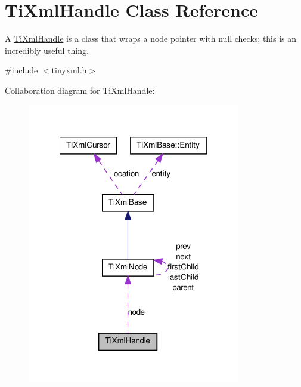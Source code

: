 \hypertarget{classTiXmlHandle}{
\section{TiXmlHandle Class Reference}
\label{dd/d98/classTiXmlHandle}
}


A \hyperlink{classTiXmlHandle}{TiXmlHandle} is a class that wraps a node pointer with null checks; this is an incredibly useful thing.  




{\ttfamily \#include $<$tinyxml.h$>$}



Collaboration diagram for TiXmlHandle:
\nopagebreak
\begin{figure}[H]
\begin{center}
\leavevmode
\includegraphics[width=264pt]{dc/d84/classTiXmlHandle__coll__graph}
\end{center}
\end{figure}
